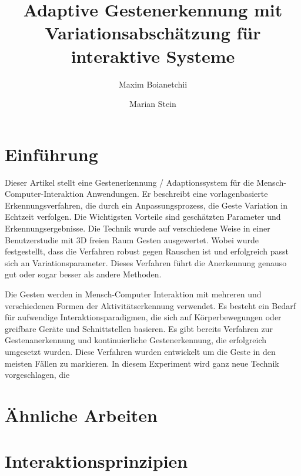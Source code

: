 \documentclass{llncs}
\begin{document}
\pagestyle{headings}

\mainmatter

\title{Adaptive Gestenerkennung mit Variationsabschätzung für interaktive Systeme}


\author{Maxim Boianetchii \and Marian Stein}



\maketitle
\section{Einführung}
Dieser Artikel stellt eine Gestenerkennung / Adaptionssystem für die Mensch-Computer-Interaktion Anwendungen. Er beschreibt eine vorlagenbasierte Erkennungsverfahren, die durch ein Anpassungsprozess, die Geste Variation in Echtzeit verfolgen. Die Wichtigsten Vorteile sind geschätzten Parameter und Erkennungsergebnisse. Die Technik wurde auf verschiedene Weise in einer Benutzerstudie mit 3D freien Raum Gesten ausgewertet. Wobei wurde festgestellt, dass die Verfahren robust gegen Rauschen ist und erfolgreich passt sich an Variationsparameter. Dieses Verfahren führt die Anerkennung genauso gut oder sogar besser als andere Methoden.

Die Gesten werden in Mensch-Computer Interaktion mit mehreren und verschiedenen Formen der Aktivitätserkennung verwendet. Es besteht ein Bedarf  für aufwendige Interaktionsparadigmen, die sich auf Körperbewegungen oder greifbare Geräte und Schnittstellen basieren. Es gibt bereits Verfahren zur Gestenanerkennung und kontinuierliche Gestenerkennung, die erfolgreich umgesetzt wurden. Diese Verfahren wurden entwickelt um die Geste in den meisten Fällen zu markieren. In diesem Experiment wird ganz neue Technik vorgeschlagen, die 


\section{Ähnliche Arbeiten}


\section{Interaktionsprinzipien}
\end{document}
